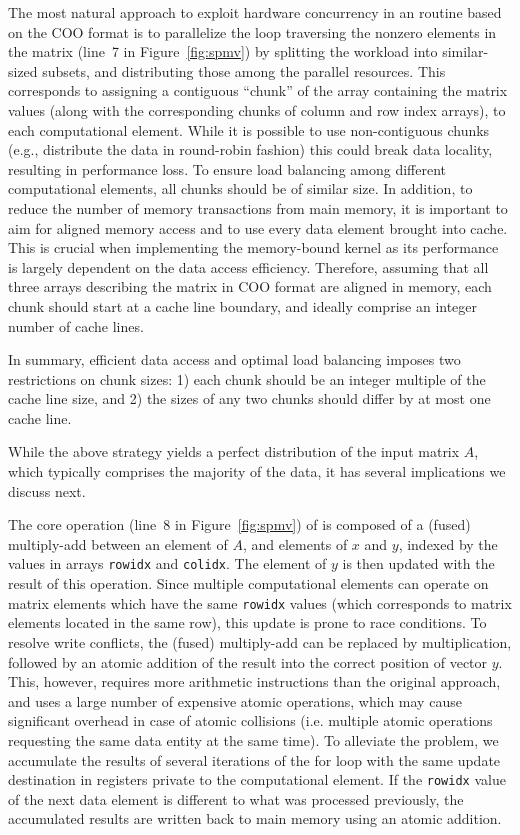 The most natural approach to exploit hardware concurrency in an \spmv routine based
on the COO format is to
parallelize the loop traversing the nonzero elements in the matrix
(line~7 in Figure~\ref{fig:spmv}) by splitting the workload into similar-sized subsets,
and distributing those among the parallel resources.
This corresponds to assigning a contiguous ``chunk'' of the
array containing the matrix values 
(along with the corresponding chunks of column and row index arrays), 
to each computational element.
While it is possible to use non-contiguous chunks (e.g., distribute the data in
round-robin fashion) this could break data locality, resulting in performance loss.
To ensure load balancing among different computational elements, all chunks
should be of similar size.
In addition, to reduce the number of memory transactions from main memory, it
is important to aim for aligned memory access and to use every data element
brought into cache.
This is crucial when implementing the memory-bound \spmv kernel as its 
performance is largely dependent
on the data access efficiency.
Therefore, assuming that all three arrays describing the matrix in COO format are aligned in memory, each chunk should start at a cache line boundary,
and ideally comprise an integer number of cache lines.

In summary, 
efficient data access and optimal load balancing imposes two restrictions on 
chunk sizes: 
1) each chunk should be an integer multiple of the cache line
size, and 
2) the sizes of any two chunks should differ by at most one cache line.

While the above strategy yields a perfect distribution of the input matrix $A$,
which typically comprises the majority of the data, it has several implications we discuss next.

The core operation (line~8 in Figure~\ref{fig:spmv}) of \coo \spmv is composed of
a (fused) multiply-add between an element of $A$, and elements of $x$ and $y$,
indexed by the values in arrays \texttt{rowidx} and \texttt{colidx}.
The element of $y$ is then updated with the result of this operation.
Since multiple computational elements can operate on matrix elements which have
the same \texttt{rowidx} values 
(which corresponds to matrix elements located in the same row),
this update is prone to race conditions.
To resolve write conflicts, the (fused) multiply-add can be replaced by multiplication,
followed by an atomic addition of the result into the correct position of
vector $y$.
This, however, requires more arithmetic instructions than the original approach,
and uses a large number of expensive atomic operations, which may
cause significant overhead in case of atomic collisions (i.e. multiple atomic
operations requesting the same data entity at the same time).
To alleviate the problem, we accumulate the results of several iterations of the for loop
with the same update destination in registers private to the computational element.
If the \texttt{rowidx} value of the next data element is different to what was processed previously, 
the accumulated results are written back to main memory using an atomic addition.

